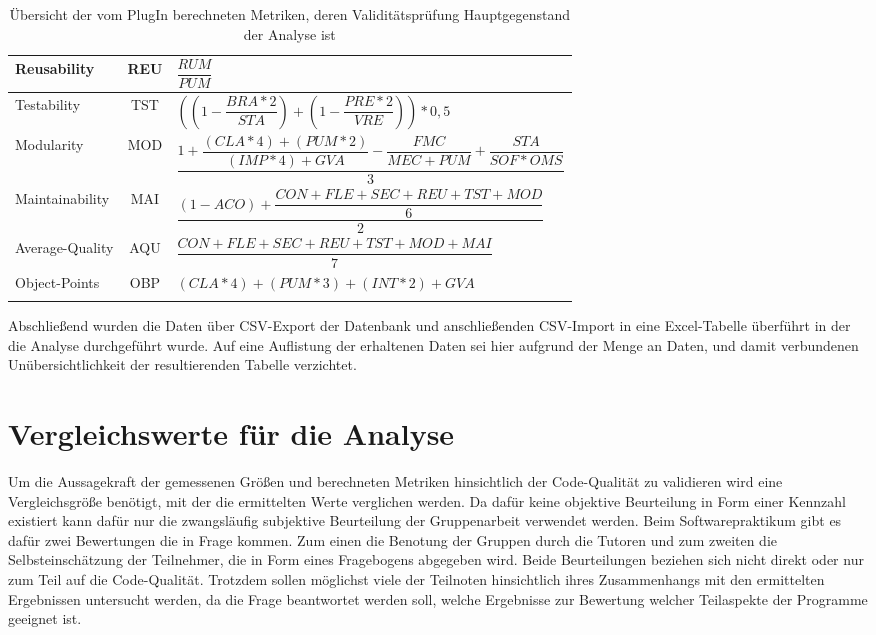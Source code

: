 \documentclass[da,ngerman]{stthesis}
\begin{document}
\begin{itemize}
\begin{center}
\begin{longtabu}{|p{0.18\textwidth}|c|p{0.68\textwidth}|}
    					\hline
    					Reusability & REU & $\dfrac{RUM}{PUM}$\\
    					\hline
    					Testability & TST & $((1 - \dfrac{BRA * 2}{STA}) + (1 - \dfrac{PRE * 2}{VRE})) * 0,5$\\
    					\hline
    					Modularity & MOD & $\dfrac{1 + \dfrac{(CLA * 4) + (PUM * 2)}{(IMP * 4) + GVA} - \dfrac{FMC}{MEC + PUM} + \dfrac{STA}{SOF * OMS}}{3}$\\
    					\hline
    					Maintainability & MAI & $\dfrac{(1 - ACO) + \dfrac{CON + FLE + SEC + REU + TST + MOD}{6}}{2}$\\
    					\hline
    					Average-Quality & AQU & $\dfrac{CON + FLE + SEC + REU + TST + MOD + MAI}{7}$\\
    					\hline
    					Object-Points & OBP & $(CLA * 4) + (PUM * 3) + (INT * 2) + GVA$\\
    					\hline
    					\caption{Übersicht der vom PlugIn berechneten Metriken, deren Validitätsprüfung Hauptgegenstand der Analyse ist}
						\label{metriken} \\
  					\end{longtabu}  
  				\end{center}
  			\end{itemize}
  			Abschließend wurden die Daten über CSV-Export der Datenbank und anschließenden CSV-Import in eine Excel-Tabelle überführt in der die Analyse durchgeführt wurde. Auf eine Auflistung der erhaltenen Daten sei hier aufgrund der Menge an Daten, und damit verbundenen Unübersichtlichkeit der resultierenden Tabelle verzichtet.
  		\section{Vergleichswerte für die Analyse}
  			Um die Aussagekraft der gemessenen Größen und berechneten Metriken hinsichtlich der Code-Qualität zu validieren wird eine Vergleichsgröße benötigt, mit der die ermittelten Werte verglichen werden. Da dafür keine objektive Beurteilung in Form einer Kennzahl existiert kann dafür nur die zwangsläufig subjektive Beurteilung der Gruppenarbeit verwendet werden. Beim Softwarepraktikum gibt es dafür zwei Bewertungen die in Frage kommen. Zum einen die Benotung der Gruppen durch die Tutoren und zum zweiten die Selbsteinschätzung der Teilnehmer, die in Form eines Fragebogens abgegeben wird. Beide Beurteilungen beziehen sich nicht direkt oder nur zum Teil auf die Code-Qualität. Trotzdem sollen möglichst viele der Teilnoten hinsichtlich ihres Zusammenhangs mit den ermittelten Ergebnissen untersucht werden, da die Frage beantwortet werden soll, welche Ergebnisse zur Bewertung welcher Teilaspekte der Programme geeignet ist.
\end{document}
